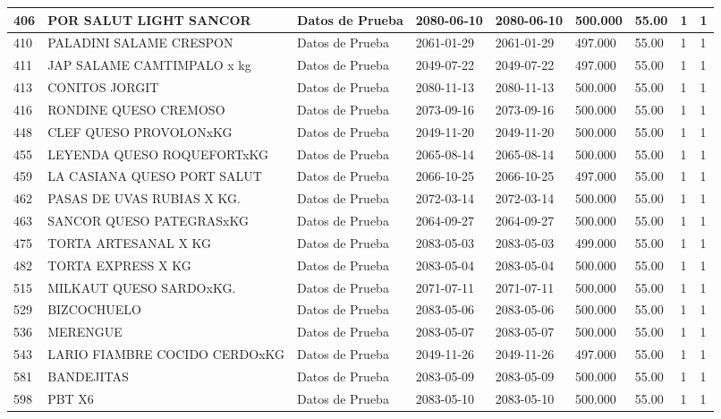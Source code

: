 \documentclass[a4paper,12pt]{article}
\begin{document}
\begin{landscape}
\begin{longtable}{|p{4cm}|p{2.5cm}|p{2.5cm}|p{1.8cm}|p{1.8cm}|p{1cm}|p{1cm}|p{3cm}|p{3cm}||}
406 & POR SALUT LIGHT SANCOR & Datos de Prueba & 2080-06-10 & 2080-06-10 & 500.000 & 55.00 & 1 & 1 \\ \hline 
410 & PALADINI SALAME CRESPON & Datos de Prueba & 2061-01-29 & 2061-01-29 & 497.000 & 55.00 & 1 & 1 \\ \hline 
411 & JAP SALAME CAMTIMPALO x kg & Datos de Prueba & 2049-07-22 & 2049-07-22 & 497.000 & 55.00 & 1 & 1 \\ \hline 
413 & CONITOS JORGIT & Datos de Prueba & 2080-11-13 & 2080-11-13 & 500.000 & 55.00 & 1 & 1 \\ \hline 
416 & RONDINE QUESO CREMOSO & Datos de Prueba & 2073-09-16 & 2073-09-16 & 500.000 & 55.00 & 1 & 1 \\ \hline 
448 & CLEF QUESO PROVOLONxKG & Datos de Prueba & 2049-11-20 & 2049-11-20 & 500.000 & 55.00 & 1 & 1 \\ \hline 
455 & LEYENDA QUESO ROQUEFORTxKG & Datos de Prueba & 2065-08-14 & 2065-08-14 & 500.000 & 55.00 & 1 & 1 \\ \hline 
459 & LA CASIANA QUESO PORT SALUT & Datos de Prueba & 2066-10-25 & 2066-10-25 & 497.000 & 55.00 & 1 & 1 \\ \hline 
462 & PASAS DE UVAS RUBIAS X KG. & Datos de Prueba & 2072-03-14 & 2072-03-14 & 500.000 & 55.00 & 1 & 1 \\ \hline 
463 & SANCOR QUESO PATEGRASxKG & Datos de Prueba & 2064-09-27 & 2064-09-27 & 500.000 & 55.00 & 1 & 1 \\ \hline 
475 & TORTA  ARTESANAL X KG & Datos de Prueba & 2083-05-03 & 2083-05-03 & 499.000 & 55.00 & 1 & 1 \\ \hline 
482 & TORTA EXPRESS X KG & Datos de Prueba & 2083-05-04 & 2083-05-04 & 500.000 & 55.00 & 1 & 1 \\ \hline 
515 & MILKAUT QUESO SARDOxKG. & Datos de Prueba & 2071-07-11 & 2071-07-11 & 500.000 & 55.00 & 1 & 1 \\ \hline 
529 & BIZCOCHUELO & Datos de Prueba & 2083-05-06 & 2083-05-06 & 500.000 & 55.00 & 1 & 1 \\ \hline 
536 & MERENGUE & Datos de Prueba & 2083-05-07 & 2083-05-07 & 500.000 & 55.00 & 1 & 1 \\ \hline 
543 & LARIO FIAMBRE COCIDO CERDOxKG & Datos de Prueba & 2049-11-26 & 2049-11-26 & 497.000 & 55.00 & 1 & 1 \\ \hline 
581 & BANDEJITAS & Datos de Prueba & 2083-05-09 & 2083-05-09 & 500.000 & 55.00 & 1 & 1 \\ \hline 
598 & PBT X6 & Datos de Prueba & 2083-05-10 & 2083-05-10 & 500.000 & 55.00 & 1 & 1 \\ \hline 

\end{longtable}
\end{landscape}
\end{document}
